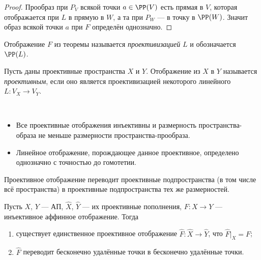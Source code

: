 \documentclass[12pt,a4paper]{article}
\begin{document}
    \begin{proof}
        Прообраз при $P_V$ всякой точки $a \in \PP(V)$ есть прямая в $V$, которая отображается при $L$ в прямую в $W$, а та при $P_W$ --- в точку в $\PP(W)$. Значит образ всякой точки $a$ при $F$ определён однозначно.
    \end{proof}

    \begin{definition}
        Отображение $F$ из теоремы называется \emph{проективизацией} $L$ и обозначается $\PP(L)$.
    \end{definition}

    \begin{definition}
        Пусть даны проективные пространства $X$ и $Y$. Отображение из $X$ в $Y$ называется \emph{проективным}, если оно является проективизацией некоторого линейного $L: V_X \to V_Y$.
    \end{definition}

    \begin{remark*}\ 
        \begin{itemize}
            \item Все проективные отображения инъективны и размерность пространства-образа не меньше размерности пространства-прообраза.
            \item Линейное отображение, порождающее данное проективное, определено однозначно с точностью до гомотетии.
        \end{itemize}
    \end{remark*}

    \begin{lemma}
        Проективное отображение переводит проективные подпространства (в том числе всё пространства) в проективные подпространства тех же размерностей.
    \end{lemma}

    \begin{theorem}
        Пусть $X$, $Y$ --- АП, $\widehat{X}$, $\widehat{Y}$ --- их проективные пополнения, $F: X \to Y$ --- инъективное аффинное отображение. Тогда
        \begin{enumerate}
            \item существует единственное проективное отображение $\widehat{F}: \widehat{X} \to \widehat{Y}$, что $\widehat{F}|_X = F$;
            \item $\widehat{F}$ переводит бесконечно удалённые точки в бесконечно удалённые точки.
        \end{enumerate}
    \end{theorem}
\end{document}
